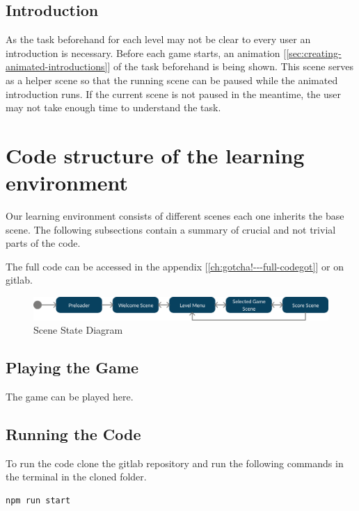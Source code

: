 \subsection{Introduction}\label{subsec:introduction}
As the task beforehand for each level may not be clear to every user an introduction is necessary.
Before each game starts, an animation [\ref{sec:creating-animated-introductions}] of the task beforehand is being shown.
This scene serves as a helper scene so that the running scene can be paused while the animated introduction runs.
If the current scene is not paused in the meantime, the user may not take enough time to understand the task.

\section{Code structure of the learning environment}\label{sec:code-structure-of-the-learning-environment}
Our learning environment consists of different scenes each one inherits the base scene.
The following subsections contain a summary of crucial and not trivial parts of the code.

The full code can be accessed in the appendix [\ref{ch:gotcha!---full-codegot}] or on gitlab\cite{gitlab-thesis}.

\begin{figure}[H]
    \centering
    \includegraphics[width=1\textwidth]{figures/statediagram}
    \caption{Scene State Diagram}
    \label{fig:statediagram}
\end{figure}

\subsection{Playing the Game}\label{subsec:playing-the-game}
The game can be played here\cite{gotscha}.

\subsection{Running the Code}\label{subsec:running-the-code}
To run the code clone the gitlab repository\cite{gitlab-thesis} and run the following commands in the terminal in the cloned folder.

\begin{lstlisting}[style=TypeScript, caption={BaseScene.ts}]
    npm run start
\end{lstlisting}

